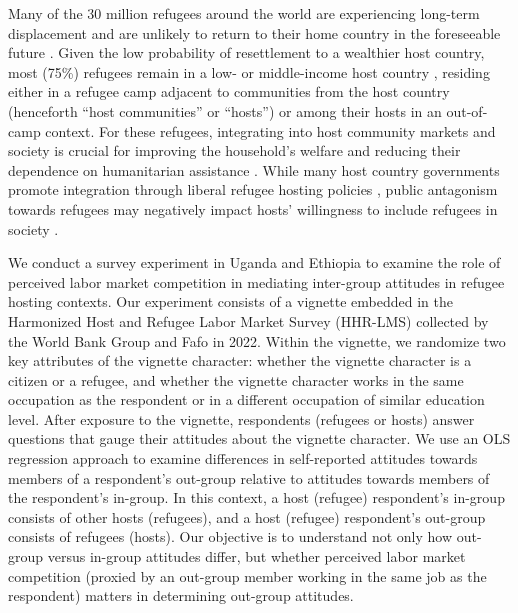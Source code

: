 \documentclass[a4paper,12pt]{article}
\begin{document}
\noindent Many of the 30 million refugees around the world are experiencing long-term displacement and are unlikely to return to their home country in the foreseeable future \citep{milner2011responding}. Given the low probability of resettlement to a wealthier host country, most (75\%) refugees remain in a low- or middle-income host country \citep{UNHCRreport2024}, residing either in a refugee camp adjacent to communities from the host country (henceforth ``host communities'' or ``hosts'') or among their hosts in an out-of-camp context. For these refugees, integrating into host community markets and society is crucial for improving the household's welfare and reducing their dependence on humanitarian assistance \citep{clements2016uganda, coate1993, glover2017}. While many host country governments promote integration through liberal refugee hosting policies \citep{UNHCRDurable, blair2022}, public antagonism towards refugees may negatively impact hosts' willingness to include refugees in society \citep{loiacono2019improving}.


We conduct a survey experiment in Uganda and Ethiopia to examine the role of perceived labor market competition in mediating inter-group attitudes in refugee hosting contexts. Our experiment consists of a vignette embedded in the Harmonized Host and Refugee Labor Market Survey (HHR-LMS) collected by the World Bank Group and Fafo in 2022. Within the vignette, we randomize two key attributes of the vignette character: whether the vignette character is a citizen or a refugee, and whether the vignette character works in the same occupation as the respondent or in a different occupation of similar education level. After exposure to the vignette, respondents (refugees or hosts) answer questions that gauge their attitudes about the vignette character. We use an OLS regression approach to examine differences in self-reported attitudes towards members of a respondent's out-group relative to attitudes towards members of the respondent's in-group. In this context, a host (refugee) respondent's in-group consists of other hosts (refugees), and a host (refugee) respondent's out-group consists of refugees (hosts). Our objective is to understand not only how out-group versus in-group attitudes differ, but whether perceived labor market competition (proxied by an out-group member working in the same job as the respondent) matters in determining out-group attitudes.
\end{document}
